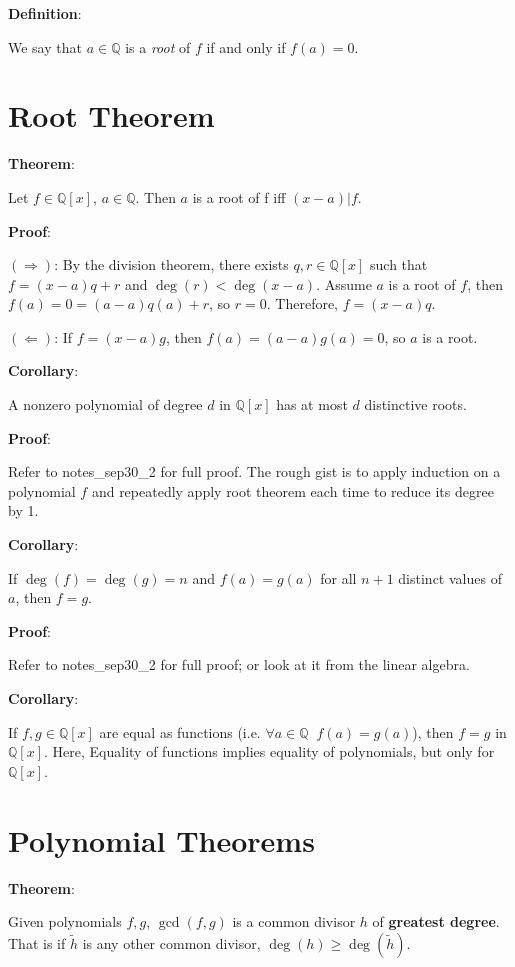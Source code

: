 \documentclass{article}
\begin{document}
\begin{multicols*}{2}
\textbf{Definition}:

We say that $a \in \mathbb{Q}$ is a \textit{root} of $f$ if and only if $f(a) = 0$.

\section{Root Theorem}

\textbf{Theorem}:

Let $f \in \mathbb{Q}[x]$, $a \in \mathbb{Q}$. Then $a$ is a root of f iff $(x-a)|f$.

\textbf{Proof}:

$(\Rightarrow)$: By the division theorem, there exists $q, r \in \mathbb{Q}[x]$ such that $f = (x-a)q + r$ and $\deg(r) < \deg(x-a)$. Assume $a$ is a root of $f$, then $f(a) = 0 = (a - a)q(a) + r$, so $r = 0$. Therefore, $f = (x-a)q$.

$(\Leftarrow)$: If $f = (x - a) g$, then $f(a) = (a - a)g(a) = 0$, so $a$ is a root.

\textbf{Corollary}:

A nonzero polynomial of degree $d$ in $\mathbb{Q}[x]$ has at most $d$ distinctive roots.

\textbf{Proof}:

Refer to notes\_sep30\_2 for full proof. The rough gist is to apply induction on a polynomial $f$ and repeatedly apply root theorem each time to reduce its degree by 1.

\textbf{Corollary}:

If $\deg(f) = \deg(g) = n$ and $f(a) = g(a)$ for all $n+1$ distinct values of $a$, then $f = g$.

\textbf{Proof}:

Refer to notes\_sep30\_2 for full proof; or look at it from the linear algebra.

\textbf{Corollary}:

If $f, g \in \mathbb{Q}[x]$ are equal as functions (i.e. $\forall a \in \mathbb{Q}\;\;f(a) = g(a)$), then $f=g$ in $\mathbb{Q}[x]$. Here, Equality of functions implies equality of polynomials, but only for $\mathbb{Q}[x]$.

\section{Polynomial Theorems}


\textbf{Theorem}:

Given polynomials $f, g$, $\gcd(f, g)$ is a common divisor $h$ of \textbf{greatest degree}. That is if $\tilde{h}$ is any other common divisor, $\deg(h) \geq \deg(\tilde{h})$.


\end{multicols*}
\end{document}
